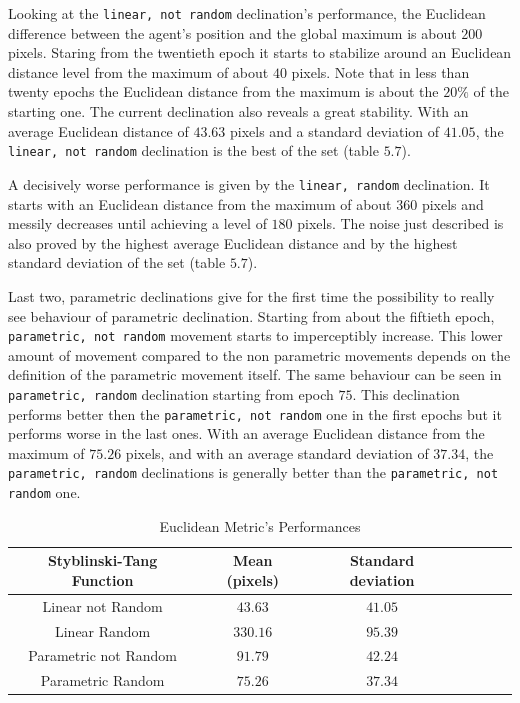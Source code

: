 Looking at the {\tt linear, not random} declination's performance, the Euclidean difference between the agent's position and the global maximum is about $200$ pixels. Staring from the twentieth epoch it starts to stabilize around an Euclidean distance level from the maximum of about $40$ pixels. Note that in less than twenty epochs the Euclidean distance from the maximum is about the $20\%$ of the starting one. The current declination also reveals a great stability. With an average Euclidean distance of $43.63$ pixels and a standard deviation of $41.05$, the {\tt linear, not random} declination is the best of the set (table $5.7$).

A decisively worse performance is given by the {\tt linear, random} declination. It starts with an Euclidean distance from the maximum of about $360$ pixels and messily decreases until achieving a level of $180$ pixels. The noise just described is also proved by the highest average Euclidean distance and by the highest standard deviation of the set (table $5.7$).

Last two, parametric declinations give for the first time the possibility to really see behaviour of parametric declination. Starting from about the fiftieth epoch, {\tt parametric, not random} movement starts to imperceptibly increase. This lower amount of movement compared to the non parametric movements depends on the definition of the parametric movement itself. The same behaviour can be seen in {\tt parametric, random} declination starting from epoch $75$. This declination performs better then the {\tt parametric, not random} one in the first epochs but it performs worse in the last ones. With an average Euclidean distance from the maximum of $75.26$ pixels, and with an average standard deviation of $37.34$, the {\tt parametric, random} declinations is generally better than the {\tt parametric, not random} one.

\begin{table}[h!]
	\centering
	\resizebox{\linewidth}{!} {
		\begin{tabular}{c| cccccc} 
			\hline \textbf{Styblinski-Tang Function}
			& \textbf{Mean (pixels)} & \textbf{Standard deviation} \\ 
			\hline Linear not Random
			& \cellcolor{red!25}$43.63$ & \cellcolor{red!25}$41.05$\\ 
			\hline Linear Random
			& $330.16$ & $95.39$ \\ 
			\hline Parametric not Random
			& $91.79$ & $42.24$\\ 
			\hline Parametric Random
			& $75.26$ & $37.34$\\ 
			\hline 
		\end{tabular} 
	}
	\label{StyblinskiTabEuclidean}
	\caption{Euclidean Metric's Performances}
\end{table}

